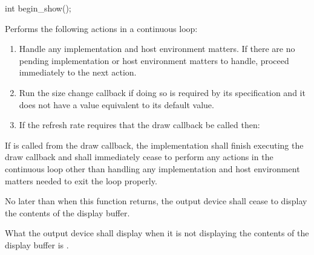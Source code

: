 %
\begin{itemdecl}
int begin_show();
\end{itemdecl}
\begin{itemdescr}
\pnum
\effects
Performs the following actions in a continuous loop:
\begin{enumerate}
	\item Handle any implementation and host environment matters. If there are no pending implementation or host environment matters to handle, proceed immediately to the next action.
	\item Run the size change callback if doing so is required by its specification and it does not have a value equivalent to its default value.
	\item If the refresh rate requires that the draw callback be called then:
\end{enumerate}

\pnum
If  is called from the draw callback, the implementation shall finish executing the draw callback and shall immediately cease to perform any actions in the continuous loop other than handling any implementation and host environment matters needed to exit the loop properly.

\pnum
No later than when this function returns, the output device shall cease to display the contents of the display buffer.

\pnum
What the output device shall display when it is not displaying the contents of the display buffer is \unspecnorm.


\end{itemdescr}
